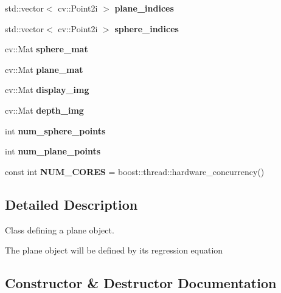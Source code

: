 \begin{DoxyCompactItemize}
std\+::vector$<$ cv\+::\+Point2i $>$ {\bfseries plane\+\_\+indices}
\item 
\hypertarget{class_plane_a94247ab1ed3d194702250a3a98643212}{}\label{class_plane_a94247ab1ed3d194702250a3a98643212} 
std\+::vector$<$ cv\+::\+Point2i $>$ {\bfseries sphere\+\_\+indices}
\item 
\hypertarget{class_plane_a1a9bdfcd38d9113a83ef12132570eff5}{}\label{class_plane_a1a9bdfcd38d9113a83ef12132570eff5} 
cv\+::\+Mat {\bfseries sphere\+\_\+mat}
\item 
\hypertarget{class_plane_a79bafd16d43b07fd7db7ed942e285109}{}\label{class_plane_a79bafd16d43b07fd7db7ed942e285109} 
cv\+::\+Mat {\bfseries plane\+\_\+mat}
\item 
\hypertarget{class_plane_a08043629802a4740847a526b16ddc0b1}{}\label{class_plane_a08043629802a4740847a526b16ddc0b1} 
cv\+::\+Mat {\bfseries display\+\_\+img}
\item 
\hypertarget{class_plane_a90280649d43c66562919b463054387e7}{}\label{class_plane_a90280649d43c66562919b463054387e7} 
cv\+::\+Mat {\bfseries depth\+\_\+img}
\item 
\hypertarget{class_plane_a3a7e69fb4f98c716cb403be89beded4c}{}\label{class_plane_a3a7e69fb4f98c716cb403be89beded4c} 
int {\bfseries num\+\_\+sphere\+\_\+points}
\item 
\hypertarget{class_plane_a59841c6147cdc9a25d7f6d9669ff6fd2}{}\label{class_plane_a59841c6147cdc9a25d7f6d9669ff6fd2} 
int {\bfseries num\+\_\+plane\+\_\+points}
\item 
\hypertarget{class_plane_abc9e342c010c172faf22b345f68f25bd}{}\label{class_plane_abc9e342c010c172faf22b345f68f25bd} 
const int {\bfseries N\+U\+M\+\_\+\+C\+O\+R\+ES} = boost\+::thread\+::hardware\+\_\+concurrency()
\end{DoxyCompactItemize}


\subsection{Detailed Description}
Class defining a plane object. 

The plane object will be defined by its regression equation 

\subsection{Constructor \& Destructor Documentation}
\hypertarget{class_plane_a94bc1ca29c305edb76676528b1a9465c}{}\label{class_plane_a94bc1ca29c305edb76676528b1a9465c} 
